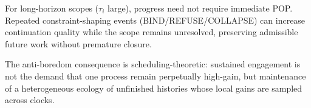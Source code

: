 \begin{proposition}
For long-horizon scopes ($\tau_i$ large), progress need not require immediate POP. Repeated
constraint-shaping events (BIND/REFUSE/COLLAPSE) can increase continuation quality while the
scope remains unresolved, preserving admissible future work without premature closure.
\end{proposition}

The anti-boredom consequence is scheduling-theoretic: sustained engagement is not the demand
that one process remain perpetually high-gain, but maintenance of a heterogeneous ecology of
unfinished histories whose local gains are sampled across clocks.
